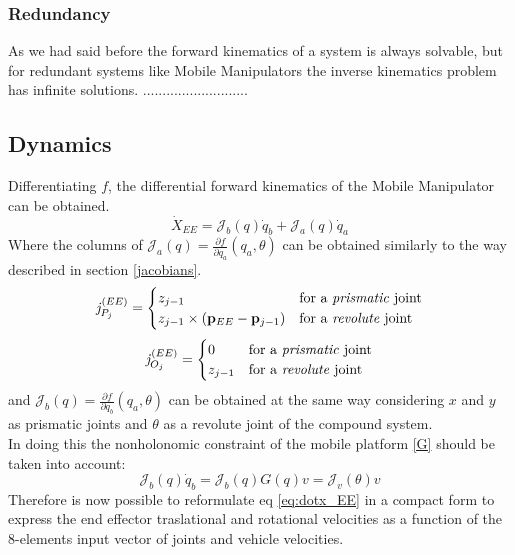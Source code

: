 \subsubsection{Redundancy}
As we had said before the forward kinematics of a system is always solvable, but for redundant systems like Mobile Manipulators the inverse kinematics problem has infinite solutions. 
...........................
\subsection{Dynamics}
Differentiating $f$, the differential forward kinematics of the Mobile Manipulator can be obtained. 
\begin{equation}\label{eq:dotx_EE}
	\dot{X}_{EE}=\mathcal{J}_b(q)\dot{q}_b+\mathcal{J}_a(q)\dot{q}_a
\end{equation}
Where the columns of $\mathcal{J}_a(q)=\frac{\partial f}{\partial q_a}(q_a,\theta)$ can be obtained similarly to the way described in section \ref{jacobians}.
\begin{equation}
\mathit{j}_{P_j}^{(EE)}=
	\begin{cases}
	z_{j-1} & \text{for a \textit{prismatic} joint} \\
	z_{j-1}\times \left(\mathbf{p}_{EE}-\mathbf{p}_{j-1}\right) & \text{for a \textit{revolute} joint}	
	\end{cases}                                             
\end{equation}
\begin{equation}
	\mathit{j}_{O_j}^{(EE)}= 
	\begin{cases}
	0 & \text{for a \textit{prismatic} joint} \\
	z_{j-1} & \text{for a \textit{revolute} joint}	
	\end{cases} 
\end{equation}
and $\mathcal{J}_b(q)=\frac{\partial f}{\partial q_b}(q_a,\theta)$ can be obtained at the same way considering $x$ and $y$ as prismatic joints and $\theta$ as a revolute joint of the compound system.\\
In doing this the nonholonomic constraint of the mobile platform \ref{G} should be taken into account:
\begin{equation}
	\mathcal{J}_b(q)\dot{q}_b=\mathcal{J}_b(q)G(q)v=\mathcal{J}_v(\theta)v
\end{equation}
Therefore is now possible to reformulate eq \ref{eq:dotx_EE} in a compact form to express the end effector traslational and rotational velocities as a function of the 8-elements input vector of joints and vehicle velocities.
